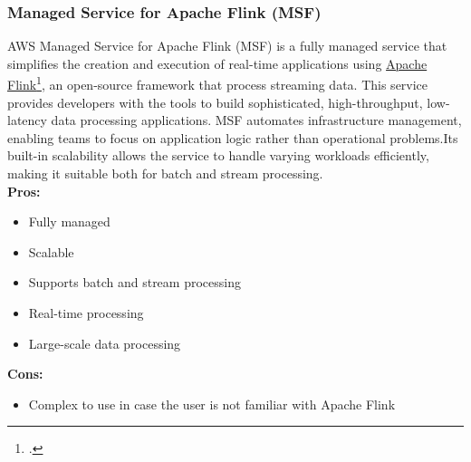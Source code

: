         \subsubsection{Managed Service for Apache Flink (MSF)}
        \label{aws:msf}
 AWS Managed Service for Apache Flink (MSF) is a fully managed service that simplifies the creation and execution of real-time applications using \href{https://flink.apache.org/}{Apache Flink}\footcite{site:apache-flink}, an open-source framework that process streaming data. This service provides developers with the tools to build sophisticated, high-throughput, low-latency data processing applications. MSF automates infrastructure management, enabling teams to focus on application logic rather than operational problems.Its built-in scalability allows the service to handle varying workloads efficiently, making it suitable both for batch and stream processing.\\

        \textbf{Pros:}
        \begin{itemize}
            \item Fully managed
            \item Scalable
            \item Supports batch and stream processing
            \item Real-time processing
            \item Large-scale data processing
        \end{itemize}
        \textbf{Cons:}
        \begin{itemize}
            \item Complex to use in case the user is not familiar with Apache Flink
        \end{itemize}

